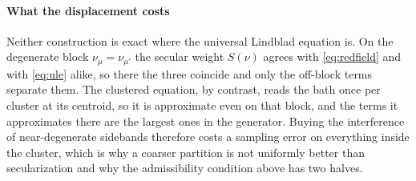 \documentclass[a4paper,11pt]{article}
\begin{document}
\paragraph{What the displacement costs}
Neither construction is exact where the universal Lindblad equation is. On the degenerate block $\nu_\mu = \nu_{\mu'}$ the secular weight $S(\nu)$ agrees with \eqref{eq:redfield} and with \eqref{eq:ule} alike, so there the three coincide and only the off-block terms separate them. The clustered equation, by contrast, reads the bath once per cluster at its centroid, so it is approximate even on that block, and the terms it approximates there are the largest ones in the generator. Buying the interference of near-degenerate sidebands therefore costs a sampling error on everything inside the cluster, which is why a coarser partition is not uniformly better than secularization and why the admissibility condition above has two halves.

\printbibliography
\end{document}
